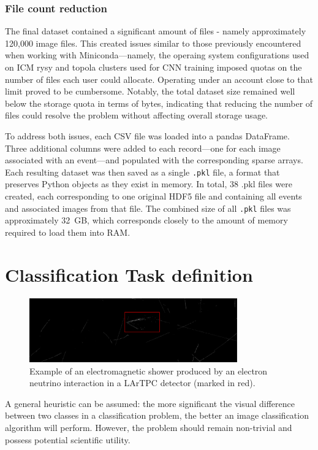 \documentclass{pracalicmgr}
\begin{document}
\subsection{File count reduction}

The final dataset contained a significant amount of files - namely approximately 120,000 image files. This created issues similar to those previously encountered when working with Miniconda—namely, the operaing system configurations used on ICM rysy and topola clusters used for CNN training imposed quotas on the number of files each user could allocate. Operating under an account close to that limit proved to be cumbersome. Notably, the total dataset size remained well below the storage quota in terms of bytes, indicating that reducing the number of files could resolve the problem without affecting overall storage usage.

To address both issues, each CSV file was loaded into a pandas DataFrame. Three additional columns were added to each record—one for each image associated with an event—and populated with the corresponding sparse arrays. Each resulting dataset was then saved as a single \texttt{.pkl} file, a format that preserves Python objects as they exist in memory. In total, 38 .pkl files were created, each corresponding to one original HDF5 file and containing all events and associated images from that file. The combined size of all \texttt{.pkl} files was approximately 32~GB, which corresponds closely to the amount of memory required to load them into RAM.

\chapter{Classification Task definition}

\begin{figure}[H]
\centering
\includegraphics[width=0.8\textwidth]{src/electronShower.pdf}
\caption{Example of an electromagnetic shower produced by an electron neutrino interaction in a LArTPC detector (marked in red).}
\label{fig:electron_shower}
\end{figure}

A general heuristic can be assumed: the more significant the visual difference between two classes in a classification problem, the better an image classification algorithm will perform. However, the problem should remain non-trivial and possess potential scientific utility.
\end{document}
